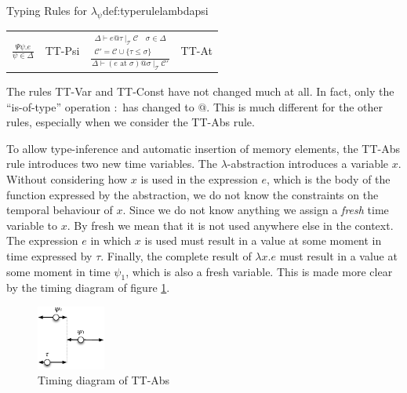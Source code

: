 \begin{definitiontitled}{Typing Rules for $\lambda_\psi$}{def:typerulelambdapsi}
\begin{tabularx}{\textwidth}{ r r X r}
$ \displaystyle
  \frac
  { \Psi \psi.e }
  { \psi \in \Delta}
$
&
TT-Psi
&

\centering
$ \displaystyle \frac{  \begin{array}{c} 
                          \Delta \vdash e @ \tau \: |_\mathcal{T} \: \mathcal{C} \quad \sigma \in \Delta \\
                          \mathcal{C}' = \mathcal{C} \cup \{ \tau \le \sigma \}
                        \end{array}}
{ \Delta \vdash (e \text{ at } \sigma) @ \sigma \: |_\mathcal{T} \: \mathcal{C}' }
$
& TT-At
\\

\end{tabularx}
\end{definitiontitled}

The rules TT-Var and TT-Const have not changed much at all.
In fact, only the ``is-of-type'' operation $:$ has changed to $@$.
This is much different for the other rules, especially when we consider the TT-Abs rule.

To allow type-inference and automatic insertion of memory elements, the TT-Abs rule introduces two new time variables.
The $\lambda$-abstraction introduces a variable $x$. 
Without considering how $x$ is used in the expression $e$, which is the body of the function expressed by the abstraction, we do not know the constraints on the temporal behaviour of $x$.
Since we do not know anything we assign a \textit{fresh} time variable to $x$.
By fresh we mean that it is not used anywhere else in the context.
The expression $e$ in which $x$ is used must result in a value at some moment in time expressed by $\tau$.
Finally, the complete result of $\lambda x.e$ must result in a value at some moment in time $\psi_1$, which is also a fresh variable.
This is made more clear by the timing diagram of figure \ref{fig:ttabs}.

\begin{figure}[h]
\centering
\includegraphics[width=0.2\textwidth]{images/ttabs}
\caption{Timing diagram of TT-Abs}
\label{fig:ttabs}
\end{figure}


